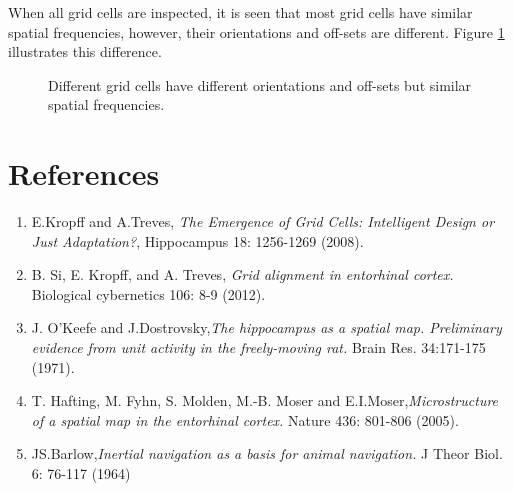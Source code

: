 \documentclass[a4paper, 12pt]{article}
\begin{document}
When all grid cells are inspected, it is seen that most grid cells have similar spatial frequencies, however, their orientations and off-sets are different. Figure \ref{diff} illustrates this difference. 

\begin{figure}
\hfill
{}
\hfill
{}
\hfill
\caption{Different grid cells have different orientations and off-sets but similar spatial frequencies.}
\label{diff}
\end{figure}
%
%
%

\newpage
\section{References}
\begin{enumerate}
\item E.Kropff and A.Treves, \textit{The Emergence of Grid Cells: Intelligent Design or Just Adaptation?}, Hippocampus 18: 1256-1269 (2008).

\item B. Si, E. Kropff, and A. Treves, \textit{Grid alignment in entorhinal cortex.} Biological cybernetics 106: 8-9 (2012).

\item J. O'Keefe and J.Dostrovsky,\textit{The hippocampus as a spatial map. Preliminary evidence from unit activity in the freely-moving rat.} Brain Res. 34:171-175 (1971). 

\item T. Hafting, M. Fyhn, S. Molden, M.-B. Moser and E.I.Moser,\textit{Microstructure of a spatial map in the entorhinal cortex.} Nature 436: 801-806 (2005).

\item JS.Barlow,\textit{Inertial navigation as a basis for animal navigation.} J Theor Biol. 6:  76-117 (1964)
\end{enumerate}
\end{document}
